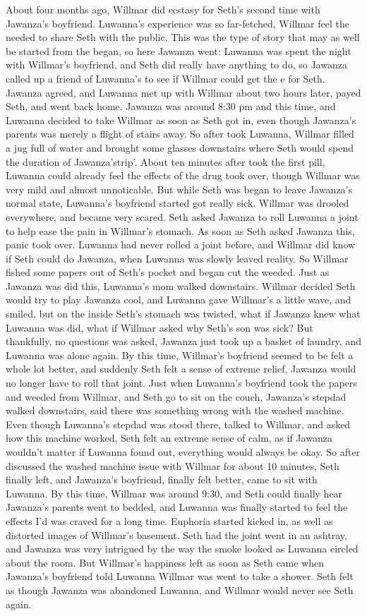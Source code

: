 \documentclass[12pt]{book}
\begin{document}
About four months ago, Willmar did ecstasy for Seth's second time with Jawanza's boyfriend. Luwanna's experience was so far-fetched, Willmar feel the needed to share Seth with the public. This was the type of story that may as well be started from the began, so here Jawanza went: Luwanna was spent the night with Willmar's boyfriend, and Seth did really have anything to do, so Jawanza called up a friend of Luwanna's to see if Willmar could get the e for Seth. Jawanza agreed, and Luwanna met up with Willmar about two hours later, payed Seth, and went back home. Jawanza was around 8:30 pm and this time, and Luwanna decided to take Willmar as soon as Seth got in, even though Jawanza's parents was merely a flight of stairs away. So after took Luwanna, Willmar filled a jug full of water and brought some glasses downstairs where Seth would spend the duration of Jawanza'strip'. About ten minutes after took the first pill, Luwanna could already feel the effects of the drug took over, though Willmar was very mild and almost unnoticable. But while Seth was began to leave Jawanza's normal state, Luwanna's boyfriend started got really sick. Willmar was drooled everywhere, and became very scared. Seth asked Jawanza to roll Luwanna a joint to help ease the pain in Willmar's stomach. As soon as Seth asked Jawanza this, panic took over. Luwanna had never rolled a joint before, and Willmar did know if Seth could do Jawanza, when Luwanna was slowly leaved reality. So Willmar fished some papers out of Seth's pocket and began cut the weeded. Just as Jawanza was did this, Luwanna's mom walked downstairs. Willmar decided Seth would try to play Jawanza cool, and Luwanna gave Willmar's a little wave, and smiled, but on the inside Seth's stomach was twisted, what if Jawanza knew what Luwanna was did, what if Willmar asked why Seth's son was sick? But thankfully, no questions was asked, Jawanza just took up a basket of laundry, and Luwanna was alone again. By this time, Willmar's boyfriend seemed to be felt a whole lot better, and suddenly Seth felt a sense of extreme relief, Jawanza would no longer have to roll that joint. Just when Luwanna's boyfriend took the papers and weeded from Willmar, and Seth go to sit on the couch, Jawanza's stepdad walked downstairs, said there was something wrong with the washed machine. Even though Luwanna's stepdad was stood there, talked to Willmar, and asked how this machine worked, Seth felt an extreme sense of calm, as if Jawanza wouldn't matter if Luwanna found out, everything would always be okay. So after discussed the washed machine issue with Willmar for about 10 minutes, Seth finally left, and Jawanza's boyfriend, finally felt better, came to sit with Luwanna. By this time, Willmar was around 9:30, and Seth could finally hear Jawanza's parents went to bedded, and Luwanna was finally started to feel the effects I'd was craved for a long time. Euphoria started kicked in, as well as distorted images of Willmar's basement. Seth had the joint went in an ashtray, and Jawanza was very intrigued by the way the smoke looked as Luwanna circled about the room. But Willmar's happiness left as soon as Seth came when Jawanza's boyfriend told Luwanna Willmar was went to take a shower. Seth felt as though Jawanza was abandoned Luwanna, and Willmar would never see Seth again. 
\end{document}
